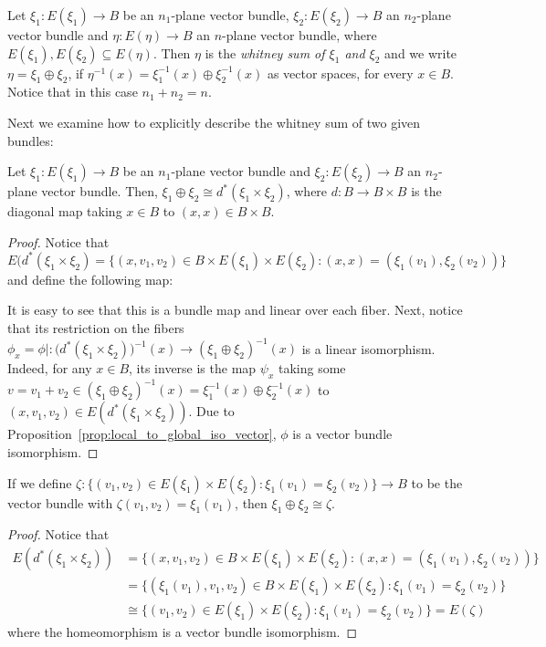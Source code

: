 \begin{definition} Let $\xi_1:E(\xi_1)\to B$ be an $n_1$-plane vector bundle, $\xi_2:E(\xi_2)\to B$ an $n_2$-plane vector bundle and $\eta:E(\eta)\to B$ an $n$-plane vector bundle, where $E(\xi_1),E(\xi_2)\subseteq E(\eta)$. Then $\eta$ is the \emph{whitney sum of $\xi_1$ and $\xi_2$} and we write $\eta=\xi_1\oplus\xi_2$, if $\eta^{-1}(x)=\xi_1^{-1}(x)\oplus\xi_2^{-1}(x)$ as vector spaces, for every $x\in B$. Notice that in this case $n_1+n_2=n$.
\end{definition}

Next we examine how to explicitly describe the whitney sum of two given bundles:
\begin{proposition} Let $\xi_1:E(\xi_1)\to B$ be an $n_1$-plane vector bundle and $\xi_2:E(\xi_2)\to B$ an $n_2$-plane vector bundle. Then, $\xi_1\oplus\xi_2\cong d^*(\xi_1\times\xi_2)$, where $d:B\to B\times B$ is the diagonal map taking $x\in B$ to $(x,x)\in B\times B$.
\end{proposition}
\begin{proof} Notice that $E(d^*(\xi_1\times\xi_2)=\big\{(x,v_1,v_2)\in B\times E(\xi_1)\times E(\xi_2):(x,x)=(\xi_1(v_1),\xi_2(v_2))\big\}$ and define the following map:
\begin{center}
\end{center}
It is easy to see that this is a bundle map and linear over each fiber. Next, notice that its restriction on the fibers $\phi_x=\phi|:\big(d^*(\xi_1\times\xi_2)\big)^{-1}(x)\to(\xi_1\oplus\xi_2)^{-1}(x)$ is a linear isomorphism. Indeed, for any $x\in B$, its inverse is the map $\psi_x$ taking some $v=v_1+v_2\in(\xi_1\oplus\xi_2)^{-1}(x)=\xi_1^{-1}(x)\oplus\xi_2^{-1}(x)$ to $(x,v_1,v_2)\in E(d^*(\xi_1\times\xi_2))$. Due to Proposition~\ref{prop:local_to_global_iso_vector}, $\phi$ is a vector bundle isomorphism.
\end{proof}
\begin{remark} If we define $\zeta:\big\{(v_1,v_2)\in E(\xi_1)\times E(\xi_2):\xi_1(v_1)=\xi_2(v_2)\big\}\to B$ to be the vector bundle with $\zeta(v_1,v_2)=\xi_1(v_1)$, then $\xi_1\oplus\xi_2\cong\zeta$.
\end{remark}
\begin{proof} Notice that
\begin{align*}
E(d^*(\xi_1\times\xi_2))&=\big\{(x,v_1,v_2)\in B\times E(\xi_1)\times E(\xi_2):(x,x)=(\xi_1(v_1),\xi_2(v_2))\big\}\\
&=\big\{(\xi_1(v_1),v_1,v_2)\in B\times E(\xi_1)\times E(\xi_2):\xi_1(v_1)=\xi_2(v_2)\big\}\\
&\cong\big\{(v_1,v_2)\in E(\xi_1)\times E(\xi_2):\xi_1(v_1)=\xi_2(v_2)\big\}=E(\zeta)
\end{align*}
where the homeomorphism is a vector bundle isomorphism.
\end{proof}
